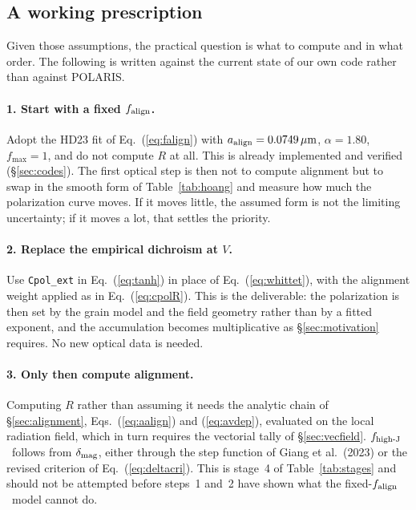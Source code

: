 \documentclass{my_memo}
\newcommand{\code}[1]{\texttt{#1}}
\newcommand{\um}{\ensuremath{\,\mu\mathrm{m}}}
\newcommand{\aalign}{\ensuremath{a_{\rm align}}}
\newcommand{\falign}{\ensuremath{f_{\rm align}}}
\newcommand{\fhighJ}{\ensuremath{f_{\rm high\text{-}J}}}
\begin{document}
\subsection{A working prescription}

Given those assumptions, the practical question is what to compute and
in what order. The following is written against the current state of our
own code rather than against POLARIS.

\paragraph{1. Start with a fixed \falign.} Adopt the HD23 fit of
Eq.~(\ref{eq:falign}) with $\aalign = 0.0749\um$, $\alpha = 1.80$,
$f_{\max} = 1$, and do not compute $R$ at all. This is already
implemented and verified (\S\ref{sec:codes}). The first optical step is
then not to compute alignment but to swap in the smooth form of
Table~\ref{tab:hoang} and measure how much the polarization curve moves.
If it moves little, the assumed form is not the limiting uncertainty; if
it moves a lot, that settles the priority.

\paragraph{2. Replace the empirical dichroism at $V$.} Use
\code{Cpol\_ext} in Eq.~(\ref{eq:tanh}) in place of
Eq.~(\ref{eq:whittet}), with the alignment weight applied as in
Eq.~(\ref{eq:cpolR}). This is the deliverable: the polarization is then
set by the grain model and the field geometry rather than by a fitted
exponent, and the accumulation becomes multiplicative as
\S\ref{sec:motivation} requires. No new optical data is needed.

\paragraph{3. Only then compute alignment.} Computing $R$ rather than
assuming it needs the analytic chain of \S\ref{sec:alignment},
Eqs.~(\ref{eq:aalign}) and (\ref{eq:avdep}), evaluated on the local
radiation field, which in turn requires the vectorial tally of
\S\ref{sec:vecfield}. \fhighJ\ follows from $\delta_{\rm mag}$, either
through the step function of Giang et al.\ (2023) or the revised
criterion of Eq.~(\ref{eq:deltacri}). This is stage~4 of
Table~\ref{tab:stages} and should not be attempted before steps~1
and~2 have shown what the fixed-\falign\ model cannot do.
\end{document}
